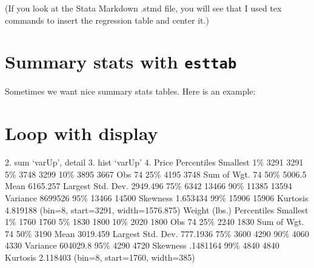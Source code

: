 \documentclass[]{article}
\begin{document}
(If you look at the Stata Markdown .stmd file, you will see that I used
tex commands to insert the regression table and center it.)

\hypertarget{summary-stats-with-esttab}{%
\section{\texorpdfstring{Summary stats with
\texttt{esttab}}{Summary stats with esttab}}\label{summary-stats-with-esttab}}

Sometimes we want nice summary stats tables. Here is an example:

\begin{stlog}

{\smallskip}





\end{stlog}

\begin{center}

\end{center}

\hypertarget{loop-with-display}{%
\section{Loop with display}\label{loop-with-display}}

\begin{stlog}

{\smallskip}

  2. sum `varUp', detail
  3. hist `varUp'
  4. {\rbr}
{\smallskip}
                            Price
      Percentiles      Smallest
 1\%         3291           3291
 5\%         3748           3299
10\%         3895           3667       Obs                  74
25\%         4195           3748       Sum of Wgt.          74
{\smallskip}
50\%       5006.5                      Mean           6165.257
                        Largest       Std. Dev.      2949.496
75\%         6342          13466
90\%        11385          13594       Variance        8699526
95\%        13466          14500       Skewness       1.653434
99\%        15906          15906       Kurtosis       4.819188
(bin=8, start=3291, width=1576.875)
{\smallskip}
                        Weight (lbs.)
      Percentiles      Smallest
 1\%         1760           1760
 5\%         1830           1800
10\%         2020           1800       Obs                  74
25\%         2240           1830       Sum of Wgt.          74
{\smallskip}
50\%         3190                      Mean           3019.459
                        Largest       Std. Dev.      777.1936
75\%         3600           4290
90\%         4060           4330       Variance       604029.8
95\%         4290           4720       Skewness       .1481164
99\%         4840           4840       Kurtosis       2.118403
(bin=8, start=1760, width=385)
{\smallskip}

\end{stlog}
\end{document}
